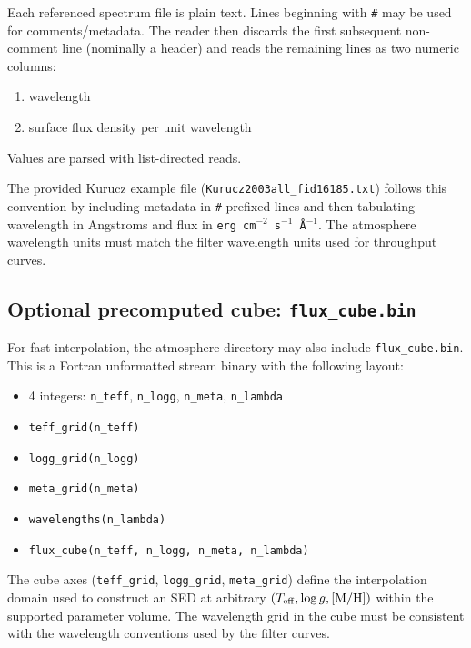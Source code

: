 \documentclass[linenumbers,apj,twocolumn, floatfix]{aastex701} \usepackage{amsmath} \usepackage{longtable} \usepackage{graphicx} \usepackage{ulem} \usepackage{xcolor} \usepackage{lettrine} \usepackage{yfonts} \usepackage{rotating}
\begin{document}
Each referenced spectrum file is plain text. Lines beginning with \texttt{\#} may be used for comments/metadata. The reader then discards the first subsequent non-comment line (nominally a header) and reads the remaining lines as two numeric columns:
\begin{enumerate}
  \item wavelength
  \item surface flux density per unit wavelength
\end{enumerate}
Values are parsed with list-directed reads.

The provided Kurucz example file (\texttt{Kurucz2003all\_fid16185.txt}) follows this convention by including metadata in \texttt{\#}-prefixed lines and then tabulating wavelength in Angstroms and flux in \texttt{erg\,cm$^{-2}$\,s$^{-1}$\,\AA$^{-1}$}.
The atmosphere wavelength units must match the filter wavelength units used for throughput curves.

\subsection{Optional precomputed cube: \texttt{flux\_cube.bin}}

For fast interpolation, the atmosphere directory may also include \texttt{flux\_cube.bin}.
This is a Fortran unformatted stream binary with the following layout:

\begin{itemize}
  \item 4 integers: \texttt{n\_teff}, \texttt{n\_logg}, \texttt{n\_meta}, \texttt{n\_lambda}
  \item \texttt{teff\_grid(n\_teff)}
  \item \texttt{logg\_grid(n\_logg)}
  \item \texttt{meta\_grid(n\_meta)}
  \item \texttt{wavelengths(n\_lambda)}
  \item \texttt{flux\_cube(n\_teff, n\_logg, n\_meta, n\_lambda)}
\end{itemize}

The cube axes (\texttt{teff\_grid}, \texttt{logg\_grid}, \texttt{meta\_grid}) define the interpolation domain used to construct an SED at arbitrary $(T_{\rm eff}, \log g, \mathrm{[M/H]})$ within the supported parameter volume.
The wavelength grid in the cube must be consistent with the wavelength conventions used by the filter curves.

{} 
\end{document}
